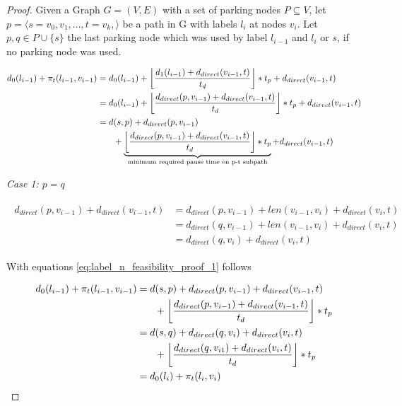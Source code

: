 \begin{proof}
	Given a Graph $G=(V,E)$ with a set of parking nodes $P \subseteq V$, let $p = \langle s=v_0,v_1,...,t=v_k, \rangle$ be a path in G with labels $l_i$ at nodes $v_i$. Let $p,q \in P \cup \{s\}$ the last parking node which was used by label $l_{i-1}$ and $l_{i}$ or $s$, if no parking node was used.

	\begin{align}
		\begin{split}\label{eq:label_n_feasibility_proof_1}
			d_0(l_{i-1}) + \pi_t(l_{i-1},v_{i-1}) &= d_0(l_{i-1})+\floor*{ \frac{d_1(l_{i-1}) + d_{direct}(v_{i-1},t)}{t_d} } * t_p + d_{direct}(v_{i-1},t)\\
			&= d_0(l_{i-1})+ \floor*{ \frac{d_{direct}(p,v_{i-1}) + d_{direct}(v_{i-1},t)}{t_d} } * t_p + d_{direct}(v_{i-1},t)\\
			&=d(s,p) + d_{direct}(p,v_{i-1})\\
			& \phantom{{}=1} + \underbrace{\floor*{ \frac{d_{direct}(p,v_{i-1}) + d_{direct}(v_{i-1},t)}{t_d} } * t_p}_\text{minimum required pause time on p-t subpath} + d_{direct}(v_{i-1},t)
		\end{split}
	\end{align}

	\emph{Case 1: $p=q$}

	\begin{align}
		\begin{split}\label{eq:label_n_feasibility_proof_2}
			d_{direct}(p,v_{i-1}) + d_{direct}(v_{i-1},t) & = d_{direct}(p,v_{i-1}) + len(v_{i-1},v_i) + d_{direct}(v_i,t) \\
			& = d_{direct}(q,v_{i-1}) + len(v_{i-1},v_i) + d_{direct}(v_i,t) \\
			& = d_{direct}(q,v_i) + d_{direct}(v_i,t)
		\end{split}
	\end{align}

	With equations \ref{eq:label_n_feasibility_proof_1} follows

	\begin{align}
		\begin{split}\label{eq:label_n_feasibility_proof_3}
			d_0(l_{i-1}) + \pi_t(l_{i-1},v_{i-1}) &= d(s,p) + d_{direct}(p,v_{i-1}) + d_{direct}(v_{i-1},t)\\
			& \phantom{{}=1} + \floor*{ \frac{d_{direct}(p,v_{i-1}) + d_{direct}(v_{i-1},t)}{t_d} } * t_p\\
			&= d(s,q) + d_{direct}(q,v_{i}) + d_{direct}(v_{i},t)\\
			& \phantom{{}=1} + \floor*{ \frac{d_{direct}(q,v_{i1}) + d_{direct}(v_{i},t)}{t_d} } * t_p\\
			&= d_0(l_{i}) + \pi_t(l_{i},v_{i})
		\end{split}
	\end{align}


\end{proof}
